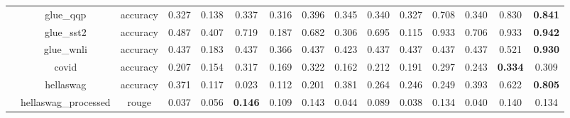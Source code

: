 \begin{table}[]
{\begin{tabular}{ccccccccccccccc}
                                   & glue\_qqp                      & accuracy                         & 0.327              & 0.138             & 0.337                      & 0.316             & 0.396                      & 0.345               & 0.340                    & 0.327               & 0.708                        & 0.340                   & 0.830                  & \textbf{0.841} \\
                                   & glue\_sst2                     & accuracy                         & 0.487              & 0.407             & 0.719                      & 0.187             & 0.682                      & 0.306               & 0.695                    & 0.115               & 0.933                        & 0.706                   & 0.933                  & \textbf{0.942} \\
                                   & glue\_wnli                     & accuracy                         & 0.437              & 0.183             & 0.437                      & 0.366             & 0.437                      & 0.423               & 0.437                    & 0.437               & 0.437                        & 0.437                   & 0.521                  & \textbf{0.930} \\
                                   & covid                          & accuracy                         & 0.207              & 0.154             & 0.317                      & 0.169             & 0.322                      & 0.162               & 0.212                    & 0.191               & 0.297                        & 0.243                   & \textbf{0.334}         & 0.309          \\
                                   & hellaswag                      & accuracy                         & 0.371              & 0.117             & 0.023                      & 0.112             & 0.201                      & 0.381               & 0.264                    & 0.246               & 0.249                        & 0.393                   & 0.622                  & \textbf{0.805} \\
                                   & hellaswag\_processed           & rouge                            & 0.037              & 0.056             & \textbf{0.146}             & 0.109             & 0.143                      & 0.044               & 0.089                    & 0.038               & 0.134                        & 0.040                   & 0.140                  & 0.134          \\

\end{tabular}}
\end{table}
